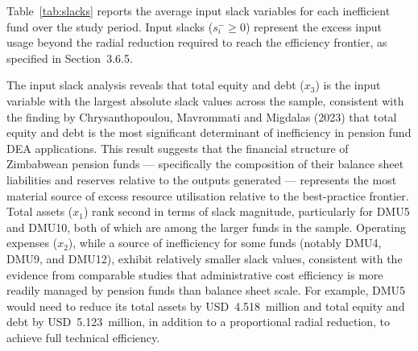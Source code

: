 \documentclass[12pt,a4paper]{article}
\begin{document}
Table~\ref{tab:slacks} reports the average input slack variables for each inefficient fund over the study period. Input slacks ($s^-_i \geq 0$) represent the excess input usage beyond the radial reduction required to reach the efficiency frontier, as specified in Section~3.6.5.

\begin{table}[H]
\centering
\caption{Average input slacks for inefficient pension funds, 2018--2022 (USD millions). Source: Authors' calculations.}
\label{tab:slacks}
\end{table}

The input slack analysis reveals that total equity and debt ($x_3$) is the input variable with the largest absolute slack values across the sample, consistent with the finding by Chrysanthopoulou, Mavrommati and Migdalas (2023) that total equity and debt is the most significant determinant of inefficiency in pension fund DEA applications. This result suggests that the financial structure of Zimbabwean pension funds --- specifically the composition of their balance sheet liabilities and reserves relative to the outputs generated --- represents the most material source of excess resource utilisation relative to the best-practice frontier. Total assets ($x_1$) rank second in terms of slack magnitude, particularly for DMU5 and DMU10, both of which are among the larger funds in the sample. Operating expenses ($x_2$), while a source of inefficiency for some funds (notably DMU4, DMU9, and DMU12), exhibit relatively smaller slack values, consistent with the evidence from comparable studies that administrative cost efficiency is more readily managed by pension funds than balance sheet scale. For example, DMU5 would need to reduce its total assets by USD~4.518~million and total equity and debt by USD~5.123~million, in addition to a proportional radial reduction, to achieve full technical efficiency.
\end{document}
